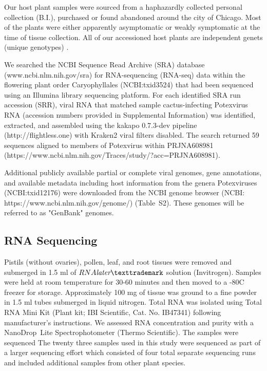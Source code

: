 \documentclass[fleqn,10pt,lineno]{wlpeerj}
\begin{document}
Our host plant samples were sourced from a haphazardly collected personal collection (B.I.), purchased or found abandoned around the city of Chicago. 
Most of the plants were either apparently asymptomatic or weakly symptomatic at the time of tissue collection.
All of our accessioned host plants are independent genets (unique genotypes) \citep{ramanauskas2021}.


We searched the NCBI Sequence Read Archive (SRA) database (www.ncbi.nlm.nih.gov/sra) for RNA-sequencing (RNA-seq) data within the flowering plant order Caryophyllales (NCBI:txid3524) that had been sequenced using an Illumina library sequencing platform. 
For each identified SRA run accession (SRR), viral RNA that matched sample cactus-infecting Potexvirus RNA (accession numbers provided in Supplemental Information) was identified, extracted, and assembled using the kakapo 0.7.3-dev pipeline (http://flightless.one) with Kraken2 viral filters disabled. 
The search returned 59 sequences aligned to members of Potexvirus within PRJNA608981 (https://www.ncbi.nlm.nih.gov/Traces/study/?acc=PRJNA608981).


Additional publicly available partial or complete viral genomes, gene annotations, and available metadata including host information from the genera Potexviruses (NCBI:txid12176) were downloaded from the NCBI genome browser (NCBI: https://www.ncbi.nlm.nih.gov/genome/) (Table~S2).
These genomes will be referred to as "GenBank" genomes.

\subsection*{RNA Sequencing}

Pistils (without ovaries), pollen, leaf, and root tissues were removed and submerged in 1.5 ml of $RNA\textit{later}{\texttrademark}$ solution (Invitrogen).
Samples were held at room temperature for 30-60 minutes and then moved to a -80\textdegree C freezer for storage.
Approximately 100 mg of tissue was ground to a fine powder in 1.5 ml tubes submerged in liquid nitrogen.
Total RNA was isolated using Total RNA Mini Kit (Plant kit; IBI Scientific, Cat. No. IB47341) following manufacturer's instructions.
We assessed RNA concentration and purity with a NanoDrop\texttrademark~Lite Spectrophotometer (Thermo Scientific).
The samples were sequenced
The twenty three samples used in this study were sequenced as part of a larger sequencing effort which consisted of four total separate sequencing runs and included additional samples from other plant species. 
\end{document}
